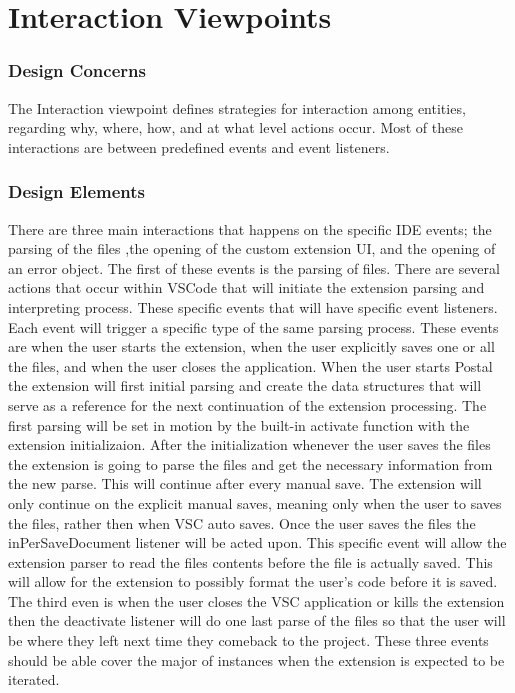 \documentclass[letterpaper,10pt,titlepage,draftclsnofoot,onecolumn,onesided] {IEEEtran}
\begin{document}
\section{Interaction Viewpoints}

\subsubsection{Design Concerns}
The Interaction viewpoint defines strategies for interaction among entities, regarding why, where, how, and
at what level actions occur. Most of these interactions are between predefined events and event listeners.

\subsubsection{Design Elements}	
	There are three main interactions that happens on the specific IDE events; the parsing of the files ,the opening of the custom extension UI, and the opening of an error object.
	The first of these events is the parsing of files. 
	There are several actions that occur within VSCode that will initiate the extension parsing and interpreting process.
	These specific events that will have specific event listeners. 
	Each event will trigger a specific type of the same parsing process.
	These events are when the user starts the extension, when the user explicitly saves one or all the files, and when the user closes the application.
	When the user starts Postal the extension will first initial parsing and create the data structures that will serve as a reference for the next continuation of the extension processing.
	The first parsing will be set in motion by the built-in activate function with the extension initializaion. 
	After the initialization whenever the user saves the files the extension is going to parse the files and get the necessary information from the new parse. 
	This will continue after every manual save.
	The extension will only continue on the explicit manual saves, meaning only when the user to saves the files, rather then when VSC auto saves. 
	Once the user saves the files the inPerSaveDocument listener will be acted upon.\cite{VSCodeDocumentation}
	This specific event will allow the extension parser to read the files contents before the file is actually saved.
	This will allow for the extension to possibly format the user's code before it is saved.
	The third even is when the user closes the VSC application or kills the extension then the deactivate listener will do one last parse of the files so that the user will be where they left next time they 	comeback to the project.
	These three events should be able cover the major of instances when the extension is expected to be iterated.\\
	
\end{document}
